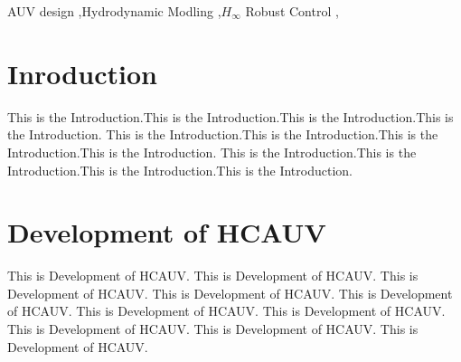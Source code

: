 \documentclass[a4paper,fleqn]{cas-dc}
\begin{document}




\begin{abstract}[S U M M A R Y]
  This is the abstract. This is the abstract. This is the abstract. This is the abstract. 
  This is the abstract. This is the abstract. This is the abstract. This is the abstract. 
  This is the abstract. This is the abstract. This is the abstract. This is the abstract. 
  This is the abstract. This is the abstract. This is the abstract. This is the abstract. 
  This is the abstract. 
\end{abstract}





\begin{keywords}
  AUV design \sep Hydrodynamic Modling \sep \emph{$H_\infty$} Robust Control \sep 
\end{keywords}

\maketitle

\section{Inroduction}\label{Indro}
This is the Introduction.This is the Introduction.This is the Introduction.This is the Introduction.
This is the Introduction.This is the Introduction.This is the Introduction.This is the Introduction.
This is the Introduction.This is the Introduction.This is the Introduction.This is the Introduction. 

\section{Development of HCAUV}
This is Development of HCAUV. This is Development of HCAUV. This is Development of HCAUV. This is Development of HCAUV.
This is Development of HCAUV. This is Development of HCAUV. This is Development of HCAUV. This is Development of HCAUV. 
This is Development of HCAUV. This is Development of HCAUV.  
\end{document}
